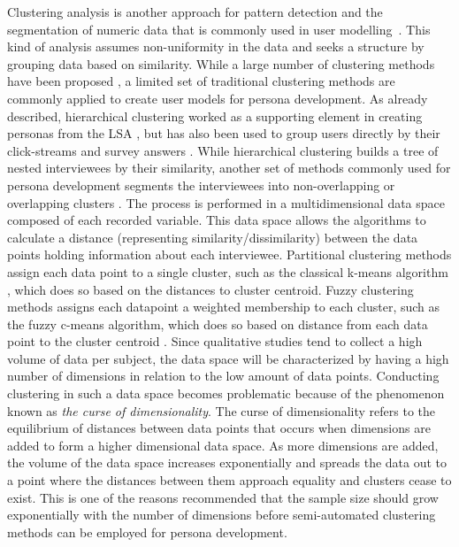 Clustering analysis is another approach for pattern detection and the segmentation of numeric data that is commonly used in user modelling~\citep{Burelli2015umuai}. This kind of analysis assumes non-uniformity in the data and seeks a structure by grouping data based on similarity. While a large number of clustering methods have been proposed \citep{Jain2010a}, a limited set of traditional clustering methods are commonly applied to create user models for persona development. As already described, hierarchical clustering worked as a supporting element in creating personas from the LSA \citep{Miaskiewicz2008}, but has also been used to group users directly by their click-streams \citep{Zhang2016} and survey answers \citep{Tu2010}. While hierarchical clustering builds a tree of nested interviewees by their similarity, another set of methods commonly used for persona development segments the interviewees into non-overlapping or overlapping clusters  \citep{Wockl2012,Masiero2011}. The process is performed in a multidimensional data space composed of each recorded variable. This data space allows the algorithms to calculate a distance (representing similarity/dissimilarity) between the data points holding information about each interviewee. Partitional clustering methods assign each data point to a single cluster, such as the classical k-means algorithm \citep{Tan2005}, which does so based on the distances to cluster centroid. Fuzzy clustering methods assigns each datapoint a weighted membership to each cluster, such as the fuzzy c-means algorithm, which does so based on distance from each data point to the cluster centroid \citep{Bezdek1984}. Since qualitative studies tend to collect a high volume of data per subject, the data space will be characterized by having a high number of dimensions in relation to the low amount of data points. Conducting clustering in such a data space becomes problematic because of the phenomenon known as \textit{the curse of dimensionality}. The curse of dimensionality refers to the equilibrium of distances between data points that occurs when dimensions are added to form a higher dimensional data space. As more dimensions are added, the volume of the data space increases exponentially and spreads the data out to a point where the distances between them approach equality and clusters cease to exist. This is one of the reasons \cite{Moser2012} recommended that the sample size should grow exponentially with the number of dimensions before semi-automated clustering methods can be employed for persona development.

